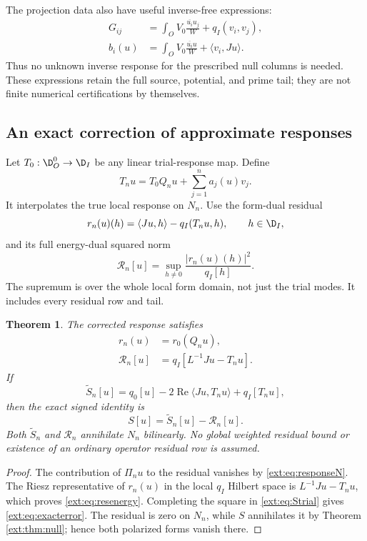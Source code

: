 \documentclass[11pt,a4paper]{article}
\numberwithin{equation}{section}
\newtheorem{theorem}{Theorem}[section]
\theoremstyle{definition}\newtheorem{definition}[theorem]{Definition}
\theoremstyle{remark}\newtheorem{remark}[theorem]{Remark}
\newcommand{\ip}[2]{\langle#1,#2\rangle}\newcommand{\norm}[1]{\lVert#1\rVert}\newcommand{\abs}[1]{\lvert#1\rvert}
\begin{document}
The projection data also have useful inverse-free expressions:
\begin{align}
 G_{ij}&=\int_O V_0\frac{\overline{u_i}u_j}{W}+q_I(v_i,v_j),\label{ext:eq:Gsource}\\
 b_i(u)&=\int_O V_0\frac{\overline{u_i}u}{W}+\ip{v_i}{Ju}.
 \label{ext:eq:bsource}
\end{align}
Thus no unknown inverse response for the prescribed null columns is needed. These expressions retain the full source, potential, and prime tail; they are not finite numerical certifications by themselves.

\subsection{An exact correction of approximate responses}
Let $T_0:\D_O^0\to\D_I$ be any linear trial-response map. Define
\begin{equation}\label{ext:eq:Tcorr}
 T_nu=T_0Q_nu+\sum_{j=1}^n a_j(u)v_j.
\end{equation}
It interpolates the true local response on $N_n$. Use the form-dual residual
\[
 r_n(u)(h)=\ip{Ju}{h}-q_I(T_nu,h),\qquad h\in\D_I,
\]
and its full energy-dual squared norm
\begin{equation}\label{ext:eq:resnorm}
 \mathcal R_n[u]=\sup_{h\ne0}\frac{|r_n(u)(h)|^2}{q_I[h]}.
\end{equation}
The supremum is over the whole local form domain, not just the trial modes. It includes every residual row and tail.

\begin{theorem}\label{ext:thm:residual}
The corrected response satisfies
\begin{align}
 r_n(u)&=r_0(Q_nu),\label{ext:eq:rcorrect}\\
 \mathcal R_n[u]&=q_I[L^{-1}Ju-T_nu].\label{ext:eq:resenergy}
\end{align}
If
\begin{equation}\label{ext:eq:Strial}
 \widetilde S_n[u]=q_0[u]-2\operatorname{Re}\ip{Ju}{T_nu}+q_I[T_nu],
\end{equation}
then the exact signed identity is
\begin{equation}\label{ext:eq:exacterror}
 \boxed{S[u]=\widetilde S_n[u]-\mathcal R_n[u].}
\end{equation}
Both $\widetilde S_n$ and $\mathcal R_n$ annihilate $N_n$ bilinearly. No global weighted residual bound or existence of an ordinary operator residual row is assumed.
\end{theorem}
\begin{proof}
The contribution of $\Pi_nu$ to the residual vanishes by \eqref{ext:eq:responseN}. The Riesz representative of $r_n(u)$ in the local $q_I$ Hilbert space is $L^{-1}Ju-T_nu$, which proves \eqref{ext:eq:resenergy}. Completing the square in \eqref{ext:eq:Strial} gives \eqref{ext:eq:exacterror}. The residual is zero on $N_n$, while $S$ annihilates it by Theorem \ref{ext:thm:null}; hence both polarized forms vanish there.
\end{proof}
\end{document}
